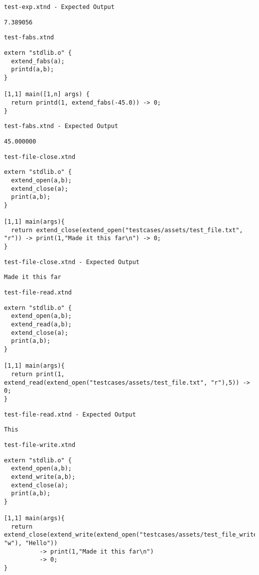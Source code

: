 \medskip \noindent \texttt{test-exp.xtnd - Expected Output}


\begin{lstlisting}
7.389056
\end{lstlisting}


\medskip \noindent \texttt{test-fabs.xtnd}


\begin{lstlisting}
extern "stdlib.o" {
  extend_fabs(a);
  printd(a,b);
}

[1,1] main([1,n] args) {
  return printd(1, extend_fabs(-45.0)) -> 0;
}
\end{lstlisting}


\medskip \noindent \texttt{test-fabs.xtnd - Expected Output}


\begin{lstlisting}
45.000000
\end{lstlisting}


\medskip \noindent \texttt{test-file-close.xtnd}


\begin{lstlisting}
extern "stdlib.o" {
  extend_open(a,b);
  extend_close(a);
  print(a,b);
}

[1,1] main(args){
  return extend_close(extend_open("testcases/assets/test_file.txt", "r")) -> print(1,"Made it this far\n") -> 0;
}
\end{lstlisting}


\medskip \noindent \texttt{test-file-close.xtnd - Expected Output}


\begin{lstlisting}
Made it this far
\end{lstlisting}


\medskip \noindent \texttt{test-file-read.xtnd}


\begin{lstlisting}
extern "stdlib.o" {
  extend_open(a,b);
  extend_read(a,b);
  extend_close(a);
  print(a,b);
}

[1,1] main(args){
  return print(1, extend_read(extend_open("testcases/assets/test_file.txt", "r"),5)) -> 0;
}
\end{lstlisting}


\medskip \noindent \texttt{test-file-read.xtnd - Expected Output}


\begin{lstlisting}
This \end{lstlisting}


\medskip \noindent \texttt{test-file-write.xtnd}


\begin{lstlisting}
extern "stdlib.o" {
  extend_open(a,b);
  extend_write(a,b);
  extend_close(a);
  print(a,b);
}

[1,1] main(args){
  return extend_close(extend_write(extend_open("testcases/assets/test_file_write.out", "w"), "Hello"))
          -> print(1,"Made it this far\n")
          -> 0;
}
\end{lstlisting}


